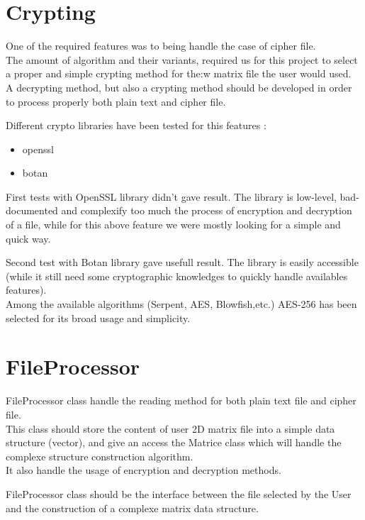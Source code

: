 \section{Crypting}

One of the required features was to being handle the case of cipher file.\\
The amount of algorithm and their variants, required us for this project to select a proper and simple crypting method for the:w matrix file the user would used.\\
A decrypting method, but also a crypting method should be developed in order to process properly both plain text and cipher file.

\par
Different crypto libraries have been tested for this features :
\begin{itemize}
	\item openssl
	\item botan
\end{itemize}

\par
First tests with OpenSSL library didn't gave result. The library is low-level, bad-documented and complexify too much the process of encryption and decryption of a file, while for this above feature we were mostly looking for a simple and quick way.

\par
Second test with Botan library gave usefull result. The library is easily accessible (while it still need some cryptographic knowledges to quickly handle availables features).\\
Among the available algorithms (Serpent, AES, Blowfish,etc.) AES-256 has been selected for its broad usage and simplicity.


\section{FileProcessor}

FileProcessor class handle the reading method for both plain text file and cipher file.\\
This class should store the content of user 2D matrix file into a simple data structure (vector), and
give an access the Matrice class which will handle the complexe structure construction algorithm.\\
It also handle the usage of encryption and decryption methods.

\par
FileProcessor class should be the interface between the file selected by the User and the construction of a complexe
matrix data structure.
